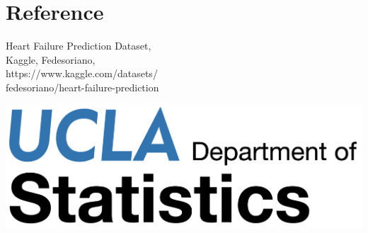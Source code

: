 \documentclass[a0paper,fleqn]{betterposter}
\begin{document}
{\begin{center}
\end{center}

\section{Reference}
Heart Failure Prediction Dataset,\\Kaggle, Fedesoriano, \\https://www.kaggle.com/datasets/\\fedesoriano/heart-failure-prediction
\vfill

\includegraphics[width=\textwidth]{UCLA_ds_001.png}\\

}
\end{document}
